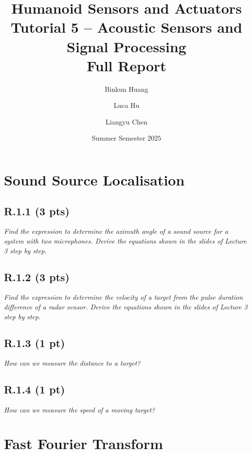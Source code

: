 \documentclass{article}
\title{\textbf{Humanoid Sensors and Actuators}\\
        Tutorial 5 – Acoustic Sensors and Signal Processing\\[4pt]
        Full Report}
\author{Binkun Huang \and Luca Hu \and Liangyu Chen}
\date{Summer Semester 2025}
\begin{document}
\maketitle



\section{Sound Source Localisation}

\subsection*{R.1.1 (3 pts)}
\emph{Find the expression to determine the azimuth angle of a sound source for a system with two microphones. Derive the equations shown in the slides of Lecture 3 step by step.}



\subsection*{R.1.2 (3 pts)}
\emph{Find the expression to determine the velocity of a target from the pulse duration difference of a radar sensor. Derive the equations shown in the slides of Lecture 3 step by step.}

\subsection*{R.1.3 (1 pt)}
\emph{How can we measure the distance to a target?}


\subsection*{R.1.4 (1 pt)}
\emph{How can we measure the speed of a moving target?}


\section{Fast Fourier Transform}
\end{document}
